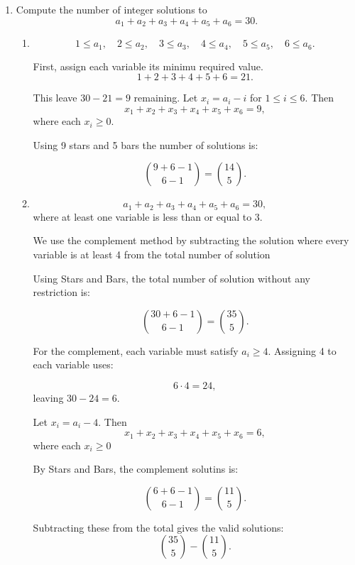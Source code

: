 \documentclass{article}
\begin{document}
\begin{enumerate}
\begin{enumerate}
We need to choose exactly 3 rooms from the available 12.

Since the 9 prints are identical, once we select the 3 rooms, there is only one way to place exactly 3 prints in each room.

Therefore, we use combination to choose the 3 rooms:

\[
\boxed{
\binom{12}{3}
}
\]

\end{enumerate}

\item
Compute the number of integer solutions to
\[
a_1 + a_2 + a_3 + a_4 + a_5 + a_6 = 30.
\]

\begin{enumerate}
  \item
  \[
  1 \leq a_1, \quad
  2 \leq a_2, \quad
  3 \leq a_3, \quad
  4 \leq a_4, \quad
  5 \leq a_5, \quad
  6 \leq a_6.
  \]

  First, assign each variable its minimu required value.
  \[
  1+2+3+4+5+6=21.
  \]

  This leave $30-21=9$ remaining. Let $x_i=a_i-i$ for $1\leq i\leq6$.
  Then
  \[
  x_1+x_2+x_3+x_4+x_5+x_6=9,
  \]
  where each $x_i\geq0$.

  Using 9 stars and 5 bars the number of solutions is:

  \[
  \boxed{\binom{9+6-1}{6-1}=\binom{14}{5}}.
  \]

  \item
  \[
  a_1 + a_2 + a_3 + a_4 + a_5 + a_6 = 30,
  \]
  where at least one variable is less than or equal to 3.

  We use the complement method by subtracting the solution where every variable is at least 4 from the total number of solution

  Using Stars and Bars, the total number of solution without any restriction is:

  \[ \binom{30+6-1}{6-1}=\binom{35}{5}.
  \]

  For the complement, each variable must satisfy $a_i\geq4$. Assigning 4 to each variable uses:

  \[ 
  6 \cdot 4 = 24,
  \]
  leaving $30-24=6$.

  Let $x_i=a_i-4$. Then
  \[
  x_1+x_2+x_3+x_4+x_5+x_6=6,
  \]
  where each $x_i\geq0$

  By Stars and Bars, the complement solutins is:

  \[
  \binom{6+6-1}{6-1}=\binom{11}{5}.
  \]

  Subtracting these from the total gives the valid solutions:
  \[
  \boxed{\binom{35}{5}-\binom{11}{5}}.
  \]


\end{enumerate}
\end{enumerate}
\end{document}
